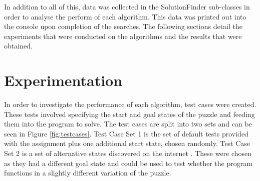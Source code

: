 \documentclass[12pt]{article}
\begin{document}
In addition to all of this, data was collected in the SolutionFinder sub-classes in order to analyse the perform of each algorithm. This data was printed out into the console upon completion of the searches. The following sections detail the experiments that were conducted on the algorithms and the results that were obtained.

\section{Experimentation}
In order to investigate the performance of each algorithm, test cases were created. These tests involved specifying the start and goal states of the puzzle and feeding them into the program to solve. The test cases are split into two sets and can be seen in Figure \ref{fig:testcases}. Test Case Set 1 is the set of default tests provided with the assignment plus one additional start state, chosen randomly. Test Case Set 2 is a set of alternative states discovered on the internet \cite{web:moretests}. These were chosen as they had a different goal state and could be used to test whether the program functions in a slightly different variation of the puzzle. 
\end{document}
